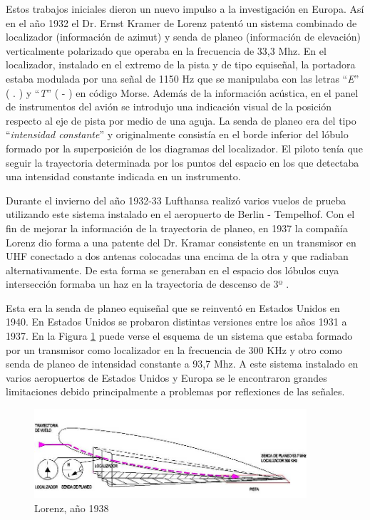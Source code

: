 Estos trabajos iniciales dieron un nuevo impulso a la investigación en Europa. Así en el año 1932
el Dr. Ernst Kramer de Lorenz patentó un sistema combinado de localizador (información de azimut)
y senda de planeo (información de elevación) verticalmente polarizado que operaba en la frecuencia
de 33,3 Mhz. En el localizador, instalado en el extremo de la pista y de tipo equiseñal, la portadora
estaba modulada por una señal de 1150 Hz que se manipulaba con las letras ``\emph{E}'' ( . ) y ``\emph{T}'' ( - ) en código Morse. Además de la información acústica, en el panel de instrumentos del avión se introdujo
una indicación visual de la posición respecto al eje de pista por medio de una aguja.
La senda de planeo era del tipo ``\emph{intensidad constante}'' y originalmente consistía en el borde
inferior del lóbulo formado por la superposición de los diagramas del localizador. El piloto tenía que
seguir la trayectoria determinada por los puntos del espacio en los que detectaba una intensidad
constante indicada en un instrumento.

Durante el invierno del año 1932-33 Lufthansa realizó varios vuelos de prueba utilizando este
sistema instalado en el aeropuerto de Berlin - Tempelhof.
Con el fin de mejorar la información de la trayectoria de planeo, en 1937 la compañía Lorenz dio
forma a una patente del Dr. Kramar consistente en un transmisor en UHF conectado a dos antenas
colocadas una encima de la otra y que radiaban alternativamente. De esta forma se generaban en el
espacio dos lóbulos cuya intersección formaba un haz en la trayectoria de descenso de 3º .

Esta era
la senda de planeo equiseñal que se reinventó en Estados Unidos en 1940.
En Estados Unidos se probaron distintas versiones entre los años 1931 a 1937.
En la Figura \ref{fig:06.ILS.Lorenz.1938}
 puede verse el esquema de un sistema que estaba formado por un transmisor como localizador
en la frecuencia de 300 KHz y otro como senda de planeo de intensidad constante a 93,7 Mhz. A
este sistema instalado en varios aeropuertos de Estados Unidos y Europa se le encontraron grandes
limitaciones debido principalmente a problemas por reflexiones de las señales.

\begin{figure}[!h]
  \centering
  \includegraphics[width = 0.9\textwidth]{06.radionavegacion/Imagenes/06.Sistemas.Aproximacion/06_1938.png}
    \caption{Lorenz, año 1938}
  \label{fig:06.ILS.Lorenz.1938}
\end{figure}

